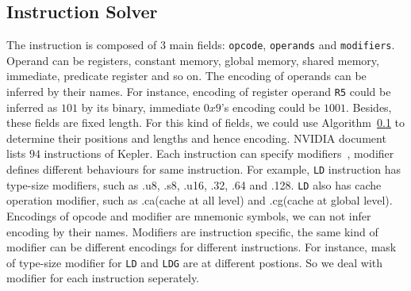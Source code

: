 \documentclass{sig-alternate-05-2015}
\begin{document}
\subsection{Instruction Solver}
The instruction is composed of $3$ main fields: {\tt opcode}, {\tt operands} and {\tt modifiers}.
Operand can be registers, constant memory, global  memory, shared memory, immediate, predicate register and so on.
The encoding of operands can be inferred by their names. For instance, encoding of register operand {\tt R5} could be
inferred as $101$ by its binary, immediate $0x9$'s encoding could be $1001$. Besides, these fields are fixed length. For this kind of
fields, we could use Algorithm~\ref{} to determine their positions and lengths and hence encoding.
NVIDIA document~\cite{} lists $94$ instructions of Kepler.
Each instruction can specify modifiers~\cite{}, modifier defines different behaviours for same instruction. For example,
{\tt LD} instruction has type-size modifiers, such as .u8, .s8, .u16, .32, .64 and .128. {\tt LD} also has cache operation
modifier, such as .ca(cache at all level) and .cg(cache at global level).
Encodings of opcode and modifier are mnemonic symbols, we can not infer encoding by their names. Modifiers are instruction
specific, the same kind of modifier can be different encodings for different instructions. For instance, mask of type-size
modifier for {\tt LD} and {\tt LDG} are at different postions. So we deal with modifier for each instruction seperately.
\end{document}

